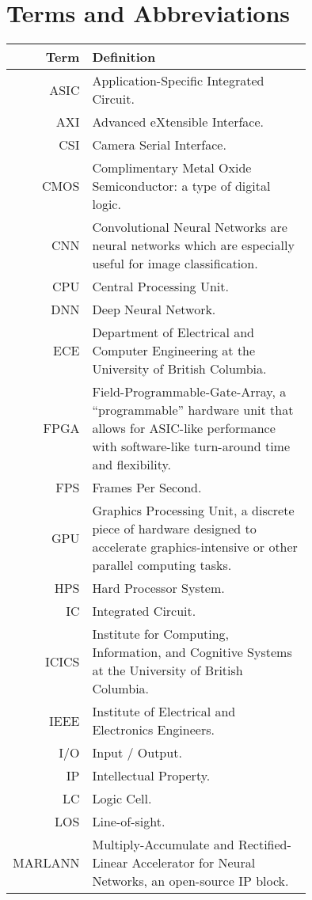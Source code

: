 \thispagestyle{empty}

\section*{Terms and Abbreviations}

\begin{tabular}[h]{rp{0.75\linewidth}}
    \hline
    \textbf{Term} & \textbf{Definition}\\
    \hline

    ASIC & Application-Specific Integrated Circuit.\\
    AXI & Advanced eXtensible Interface. \\
    CSI & Camera Serial Interface. \\
    CMOS & Complimentary Metal Oxide Semiconductor: a type of digital logic. \\
    CNN & Convolutional Neural Networks are neural networks which are especially useful for image classification.\cite{cnn} \\
    CPU & Central Processing Unit. \\
    DNN & Deep Neural Network. \\
    ECE & Department of Electrical and Computer Engineering at the University of British Columbia.\\
    FPGA & Field-Programmable-Gate-Array, a ``programmable'' hardware unit that allows for ASIC-like performance with software-like turn-around time and flexibility.\\
    FPS & Frames Per Second.\\
    GPU & Graphics Processing Unit, a discrete piece of hardware designed to accelerate graphics-intensive or other parallel computing tasks.\\
    HPS & Hard Processor System. \\
    IC & Integrated Circuit. \\
	ICICS & Institute for Computing, Information, and Cognitive Systems at the University of British Columbia.\\
    IEEE & Institute of Electrical and Electronics Engineers. \\
    I/O & Input / Output. \\
    IP & Intellectual Property. \\
    LC & Logic Cell. \\
    LOS & Line-of-sight.\\
    MARLANN & Multiply-Accumulate and Rectified-Linear Accelerator for Neural Networks, an open-source IP block. \\

\end{tabular}
